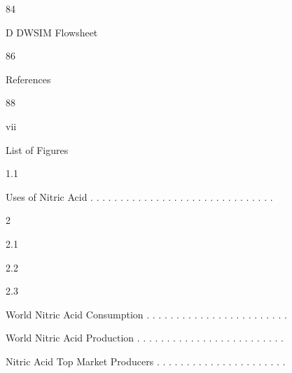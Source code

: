 \documentclass[a4paper,portrait,12pt]{article}
\begin{document}
84





\begin{flushleft}
D DWSIM Flowsheet
\end{flushleft}





86





\begin{flushleft}
References
\end{flushleft}





88





\begin{flushleft}
vii
\end{flushleft}





\begin{flushleft}
\newpage
List of Figures
\end{flushleft}


1.1





\begin{flushleft}
Uses of Nitric Acid . . . . . . . . . . . . . . . . . . . . . . . . . . . . . . .
\end{flushleft}





2





2.1


2.2


2.3





\begin{flushleft}
World Nitric Acid Consumption . . . . . . . . . . . . . . . . . . . . . . . .
\end{flushleft}


\begin{flushleft}
World Nitric Acid Production . . . . . . . . . . . . . . . . . . . . . . . . .
\end{flushleft}


\begin{flushleft}
Nitric Acid Top Market Producers . . . . . . . . . . . . . . . . . . . . . .
\end{flushleft}
\end{document}
